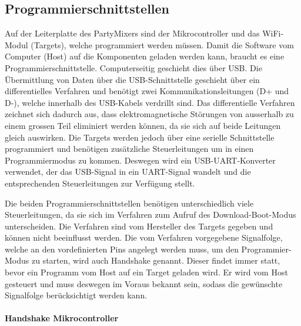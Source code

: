 \subsection{Programmierschnittstellen}
\label{subsec:Programmierschnittstellen}

Auf der Leiterplatte des PartyMixers sind der Mikrocontroller und das WiFi-Modul (Targets), welche programmiert werden müssen. Damit die Software vom Computer (Host) auf die Komponenten geladen werden kann, braucht es eine Programmierschnittstelle. Computerseitig geschieht dies über USB.
Die Übermittlung von Daten über die USB-Schnittstelle geschieht über ein differentielles Verfahren und benötigt zwei Kommunikationsleitungen (D+ und D-), welche innerhalb des USB-Kabels verdrillt sind. Das differentielle Verfahren zeichnet sich dadurch aus, dass elektromagnetische Störungen von ausserhalb zu einem grossen Teil eliminiert werden können, da sie sich auf beide Leitungen gleich auswirken. Die Targets werden jedoch über eine serielle Schnittstelle programmiert und benötigen zusätzliche Steuerleitungen um in einen Programmiermodus zu kommen. Deswegen wird ein USB-UART-Konverter verwendet, der das USB-Signal in ein UART-Signal wandelt und die entsprechenden Steuerleitungen zur Verfügung stellt. 

Die beiden Programmierschnittstellen benötigen unterschiedlich viele Steuerleitungen, da sie sich im Verfahren zum Aufruf des Download-Boot-Modus unterscheiden. Die Verfahren sind vom Hersteller des Targets gegeben und können nicht beeinflusst werden.
Die vom Verfahren vorgegebene Signalfolge, welche an den vordefinierten Pins angelegt werden muss, um den Programmier-Modus zu starten, wird auch Handshake genannt. Dieser findet immer statt, bevor ein Programm vom Host auf ein Target geladen wird.
Er wird vom Host gesteuert und muss deswegen im Voraus bekannt sein, sodass die gewünschte Signalfolge berücksichtigt werden kann.

\paragraph{Handshake Mikrocontroller}\mbox{}

